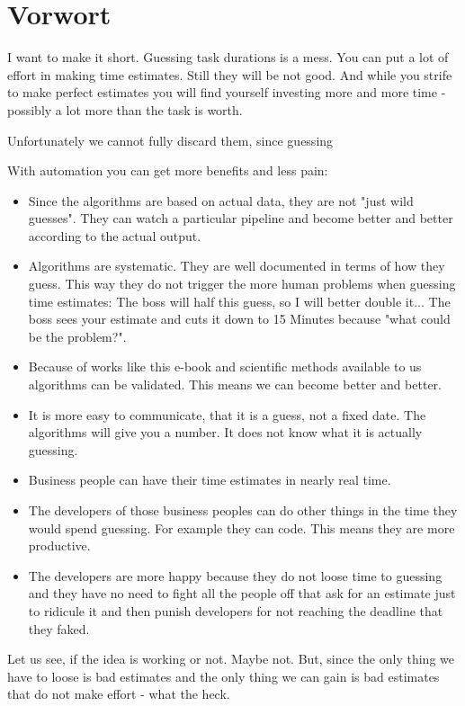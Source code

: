 \hypertarget{foreword}{%
\section{Vorwort}\label{foreword}}

I want to make it short. Guessing task durations is a mess. You can put a lot of effort in making time estimates. Still they will be not good. And while you strife to make perfect estimates you will find yourself investing more and more time - possibly a lot more than the task is worth.

Unfortunately we cannot fully discard them, since guessing

With automation you can get more benefits and less pain:

\begin{itemize}
\tightlist
\item
  Since the algorithms are based on actual data, they are not "just wild guesses". They can watch a particular pipeline and become better and better according to the actual output.
\item
  Algorithms are systematic. They are well documented in terms of how they guess. This way they do not trigger the more human problems when guessing time estimates: The boss will half this guess, so I will better double it... The boss sees your estimate and cuts it down to 15 Minutes because "what could be the problem?".
\item
  Because of works like this e-book and scientific methods available to us algorithms can be validated. This means we can become better and better.
\item
  It is more easy to communicate, that it is a guess, not a fixed date. The algorithms will give you a number. It does not know what it is actually guessing. 
\item
  Business people can have their time estimates in nearly real time.
\item
  The developers of those business peoples can do other things in the time they would spend guessing. For example they can code. This means they are more productive.
\item
  The developers are more happy because they do not loose time to guessing and they have no need to fight all the people off that ask for an estimate just to ridicule it and then punish developers for not reaching the deadline that they faked. 
\end{itemize}

Let us see, if the idea is working or not. Maybe not. But, since the only thing we have to loose is bad estimates and the only thing we can gain is bad estimates that do not make effort - what the heck.
